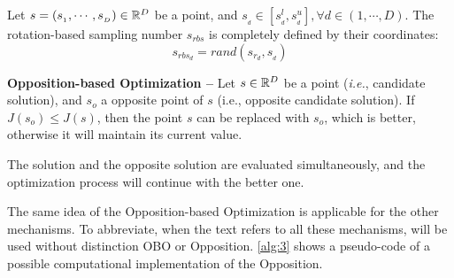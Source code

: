 \begin{definition}
Let $s = (s_{_1}, \cdots, s_{_D}) \in \mathbb{R}^D$ be a point, and $s_{_d} \in \left[s^l_{_d}, s^u_{_d}\right], \forall d \in \left(1, \cdots, D \right)$. The rotation-based sampling number $s_{rbs}$ is completely defined by their coordinates:
%
\begin{equation}
s_{rbs_d} = rand(s_{r_d},s_{_d})
\end{equation}

\end{definition}

\begin{definition} \textbf{Opposition-based Optimization --}
Let $s \in \mathbb{R}^D$ be a point (\textit{i.e.}, candidate solution), and $s_o$ a opposite point of $s$ (i.e., opposite candidate solution). If $J(s_o) \leq J(s)$, then the point $s$ can be replaced with $s_o$, which is better, otherwise it will maintain its current value.
\end{definition}

The solution and the opposite solution are evaluated simultaneously, and the optimization process will continue with the better one.

The same idea of the Opposition-based Optimization is applicable for the other mechanisms. To abbreviate, when the text refers to all these mechanisms, will be used without distinction OBO or Opposition. \autoref{alg:3} shows a pseudo-code of a possible computational implementation of the Opposition.

